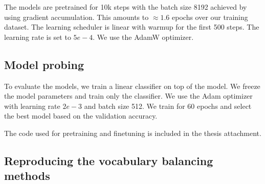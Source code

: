 The models are pretrained for 10k steps with the batch size 8192 achieved by using gradient accumulation. This amounts to $\approx 1.6$ epochs over our training dataset. The learning scheduler is linear with warmup for the first 500 steps. The learning rate is set to $5e-4$. We use the AdamW optimizer.

\subsection{Model probing}
\label{sec:model_probing}

To evaluate the models, we train a linear classifier on top of the model. We freeze the model parameters and train only the classifier. We use the Adam optimizer with learning rate $2e-3$ and batch size 512. We train for 60 epochs and select the best model based on the validation accuracy.

The code used for pretraining and finetuning is included in the thesis attachment.



\subsection{Reproducing the vocabulary balancing methods}
\label{sec:reproducing_the_vocabulary_balancing_methods}

